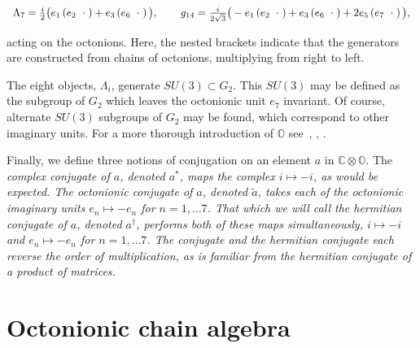 \documentclass[letterpaper,12pt,titlepage,oneside,final]{book}
\begin{document}
\begin{equation}
\begin{array}{lll}
\Lambda_7 = \frac{i}{2}\big(e_1\left(e_2\hspace{2mm} \cdot\hspace{1mm}\right)+e_3\left(e_6 \hspace{2mm}\cdot\hspace{1mm}\right) \big),  
&\hspace{1mm}&  g_{14} = \frac{i}{2\sqrt{3}}\big(-e_1\left(e_2\hspace{2mm} \cdot\hspace{1mm}\right)+e_3\left(e_6 \hspace{2mm}\cdot\hspace{1mm}\right)   +   2e_5\left(e_7 \hspace{2mm}\cdot\hspace{1mm}\right) \big) ,

\end{array}\end{equation}

\noindent acting on the octonions.  Here, the nested brackets indicate that the generators are constructed from chains of octonions, multiplying from right to left.  

The eight objects, $\Lambda_i$, generate $SU(3)\subset G_2$.    This $SU(3)$ may be defined as the subgroup of $G_2$ which leaves the octonionic unit $e_7$ invariant.  Of course,  alternate $SU(3)$ subgroups of $G_2$ may be found, which correspond to other imaginary units. For a more thorough introduction of $\mathbb{O}$ see~\cite{baez}, \cite{conway}, \cite{okubo}.

Finally, we define three notions of conjugation on an element $a$ in $\mathbb{C}\otimes\mathbb{O}$.  The \it complex conjugate \rm of $a$, denoted $a^*$, maps the complex $i\mapsto -i$, as would be expected.  The \it octonionic conjugate \rm of $a$, denoted $\tilde{a}$, takes each of the octonionic imaginary units $e_n\mapsto -e_n$ for $n=1,\dots 7$.  That which we will call the \it hermitian conjugate \rm of $a$, denoted $a^{\dagger}$, performs both of these maps simultaneously, $i \mapsto -i$ and $e_n \mapsto -e_n$ for $n=1,\dots 7$.  The conjugate and the hermitian conjugate each reverse the order of multiplication, as is familiar from the hermitian conjugate of a product of matrices.












\section{Octonionic chain algebra\label{chain}  }
\end{document}
